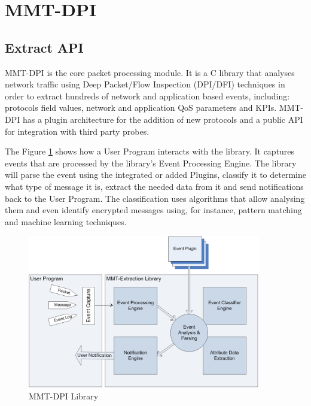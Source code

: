 \clearpage

\section{MMT-DPI}
\label{Developers}


\subsection{Extract API}


MMT-DPI is the core packet processing module. It is a C library that analyses network traffic using Deep Packet/Flow Inspection (DPI/DFI) techniques in order to extract hundreds of network and application based events, including: protocols field values, network and application QoS parameters and KPIs. MMT-DPI has a plugin architecture for the addition of new protocols and a public API for integration with third party probes. 

The Figure \ref{extract_lib} shows how a User Program interacts with the library. It captures events that are processed by the library{\textquoteright}s Event Processing Engine. The library will parse the event using the integrated or added Plugins, classify it to determine what type of message it is, extract the needed data from it and send notifications back to the User Program. The classification uses algorithms that allow analysing them and even identify encrypted messages using, for instance, pattern matching and machine learning techniques.


\begin{figure}[H]
\centering
\includegraphics[width=4in]{img/extract_lib.png}
\caption{MMT-DPI Library}\label{extract_lib}
\end{figure}


